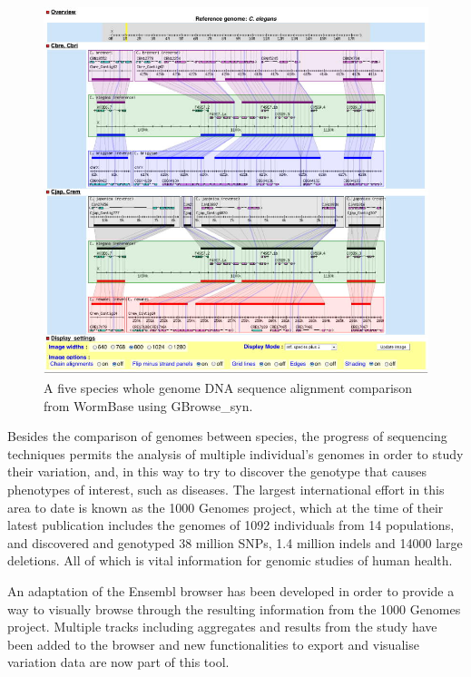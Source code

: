 \begin{figure}  
\centering
\includegraphics[width=\textwidth]{figures/gbrowse_syn.jpg}
\caption[Multiple alignment snapshot generated with GBrowse\_syn.]{A five species whole genome DNA sequence alignment comparison from WormBase using GBrowse\_syn.
\label{fig:gbrowsesyn}}
\end{figure}

Besides the comparison of genomes between species, the progress of sequencing techniques permits the analysis of multiple individual's genomes in order to study their variation, and, in this way to try to discover the genotype that causes phenotypes of interest, such as diseases. The largest international effort in this area to date is known as the 1000 Genomes project, which at the time of their latest publication \cite{GEN2012} includes the genomes of 1092 individuals from 14 populations, and discovered and genotyped 38 million SNPs, 1.4 million indels and 14000 large deletions. All of which is vital information for genomic studies of human health.

An adaptation of the Ensembl browser has been developed in order to provide a way to visually browse through the resulting information from the 1000 Genomes project. Multiple tracks including aggregates and results from the study have been added to the browser and new functionalities to export and visualise variation data are now part of this tool.

